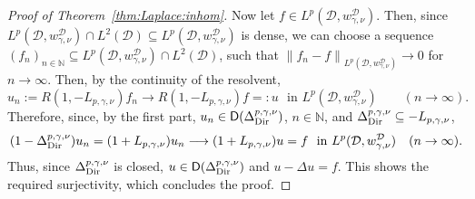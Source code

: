\documentclass[12pt,a4paper, reqno]{amsart}
\theoremstyle{plain}
\theoremstyle{definition}
\theoremstyle{remark}
\numberwithin{equation}{section}
\newcommand{\1}{\mathbbm{1}}
\newcommand{\N}{\ensuremath{\mathbb{N}}}
\newcommand{\calD}{\ensuremath{\mathcal{D}}}
\newcommand{\sfD}{\ensuremath{\mathsf{D}}}
\newcommand{\Dir}{\textup{Dir}}
\newcommand{\nrm}[1]{\left\lVert #1 \right\rVert}
\begin{document}
\begin{proof}[Proof of Theorem~\ref{thm:Laplace:inhom}]
Now let $f\in L^p(\calD,w_{\gamma,\nu}^\calD)$. Then, since $L^p(\calD,w_{\gamma,\nu}^\calD)\cap L^2(\calD)\subseteq L^p(\calD,w_{\gamma,\nu}^\calD)$ is dense, we can choose a sequence $(f_n)_{n\in\N}\subseteq L^p(\calD,w_{\gamma,\nu}^\calD)\cap L^2(\calD)$, such that $\nrm{f_n-f}_{L^p(\calD,w_{\gamma,\nu}^\calD)}\to 0$ for $n\to\infty$.  
Then, by the continuity of the resolvent,
\[
u_n:=R(1,-L_{p,\gamma,\nu})f_n\longrightarrow R(1,-L_{p,\gamma,\nu})f=:u\,\,\text{ in }L^p(\calD,w_{\gamma,\nu}^\calD)\qquad (n\to\infty).
\]
Therefore, since, by the first part, $u_n\in \sfD(\Delta_\Dir^{p,\gamma,\nu})$, $n\in\N$, and $\Delta_\Dir^{p,\gamma,\nu}\subseteq -L_{p,\gamma,\nu}$, 
\[
(1-\Delta_\Dir^{p,\gamma,\nu})u_n 
=
(1+L_{p,\gamma,\nu})u_n
\longrightarrow
(1+L_{p,\gamma,\nu})u 
= 
f
\,\,\text{ in }L^p(\calD,w_{\gamma,\nu}^\calD)\quad (n\to\infty).
\]
Thus, since $\Delta_\Dir^{p,\gamma,\nu}$ is closed, 
$u\in \sfD(\Delta_\Dir^{p,\gamma,\nu})$ and $u-\Delta u=f$.
This shows the required surjectivity, which concludes the proof.
\end{proof}
\end{document}
